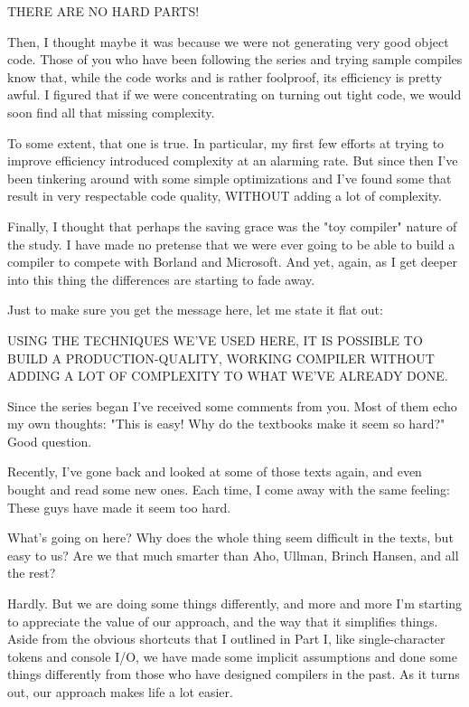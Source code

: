 \documentclass[float=false, crop=false]{standalone}
\begin{document}
\begin{emeration}
                     THERE ARE NO HARD PARTS!


Then, I thought maybe it was because we were not generating very good object
code. Those of you who have been following the series and trying sample compiles
know that, while the code works and is rather foolproof, its efficiency is
pretty awful. I figured that if we were concentrating on turning out tight code,
we would soon find all that missing complexity.

To some extent, that one is true. In particular, my first few efforts at trying
to improve efficiency introduced complexity at an alarming rate. But since then
I've been tinkering around with some simple optimizations and I've found some
that result in very respectable code quality, WITHOUT adding a lot of
complexity.

Finally, I thought that perhaps the saving grace was the "toy compiler" nature
of the study. I have made no pretense that we were ever going to be able to
build a compiler to compete with Borland and Microsoft. And yet, again, as I get
deeper into this thing the differences are starting to fade away.

Just to make sure you get the message here, let me state it flat out:

   USING THE TECHNIQUES WE'VE USED  HERE,  IT  IS  POSSIBLE TO
   BUILD A PRODUCTION-QUALITY, WORKING COMPILER WITHOUT ADDING
   A LOT OF COMPLEXITY TO WHAT WE'VE ALREADY DONE.


Since the series began I've received some comments from you. Most of them echo
my own thoughts: "This is easy! Why do the textbooks make it seem so hard?" Good
question.

Recently, I've gone back and looked at some of those texts again, and even
bought and read some new ones. Each time, I come away with the same feeling:
These guys have made it seem too hard.

What's going on here? Why does the whole thing seem difficult in the texts, but
easy to us? Are we that much smarter than Aho, Ullman, Brinch Hansen, and all
the rest?

Hardly. But we are doing some things differently, and more and more I'm starting
to appreciate the value of our approach, and the way that it simplifies things.
Aside from the obvious shortcuts that I outlined in Part I, like
single-character tokens and console I/O, we have made some implicit assumptions
and done some things differently from those who have designed compilers in the
past. As it turns out, our approach makes life a lot easier.


\end{emeration}
\end{document}
